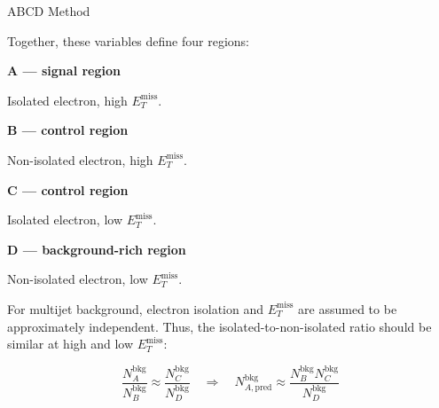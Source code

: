 \documentclass[final]{beamer}
\newlength{\postercontentwidth}
\newlength{\postermaincolumnwidth}
\begin{document}
\begin{frame}[t]
\begin{columns}[t,totalwidth=\postercontentwidth]
\begin{column}{\postermaincolumnwidth}
\begin{block}{ABCD Method}
{          \vspace{0.18cm}

          Together, these variables define four regions:\par

          \vspace{0.12cm}

          \begin{minipage}[t]{0.48\linewidth}
            \vspace{0pt}
            \textbf{A --- signal region}\par
            Isolated electron, high \(E_T^{\mathrm{miss}}\).
          \end{minipage}%
          \hfill
          \begin{minipage}[t]{0.48\linewidth}
            \vspace{0pt}
            \textbf{B --- control region}\par
            Non-isolated electron, high \(E_T^{\mathrm{miss}}\).
          \end{minipage}\par

          \vspace{0.16cm}

          \begin{minipage}[t]{0.48\linewidth}
            \vspace{0pt}
            \textbf{C --- control region}\par
            Isolated electron, low \(E_T^{\mathrm{miss}}\).
          \end{minipage}%
          \hfill
          \begin{minipage}[t]{0.48\linewidth}
            \vspace{0pt}
            \textbf{D --- background-rich region}\par
            Non-isolated electron, low \(E_T^{\mathrm{miss}}\).
          \end{minipage}\par

          \vspace{0.22cm}

          For multijet background, electron isolation and
          \(E_T^{\mathrm{miss}}\) are assumed to be approximately independent.
          Thus, the isolated-to-non-isolated ratio should be similar at high and
          low \(E_T^{\mathrm{miss}}\):\par
        }

        {\fontsize{24pt}{30pt}\selectfont
          \[
            \frac{N_A^{\mathrm{bkg}}}{N_B^{\mathrm{bkg}}}
            \approx
            \frac{N_C^{\mathrm{bkg}}}{N_D^{\mathrm{bkg}}}
            \quad\Longrightarrow\quad
            N_{A,\mathrm{pred}}^{\mathrm{bkg}}
            \approx
            \frac{N_B^{\mathrm{bkg}}N_C^{\mathrm{bkg}}}
                 {N_D^{\mathrm{bkg}}}
          \]
        }


\end{block}
\end{column}
\end{columns}
\end{frame}
\end{document}
